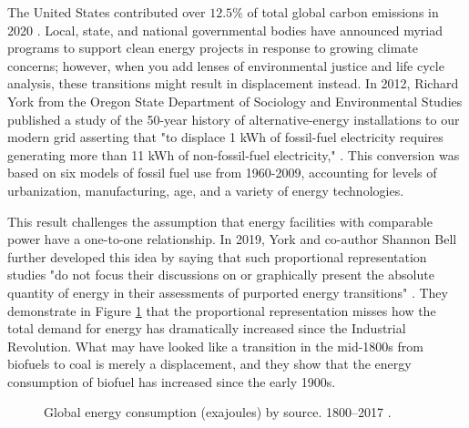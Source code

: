 The United States contributed over $12.5\%$ of total global carbon emissions
in 2020 \cite{european_commission_joint_research_centre_ghg_2021}. Local, state, and national governmental bodies have announced myriad programs to support clean energy projects in response to growing climate concerns; however, when you add lenses of environmental justice and life cycle analysis, these transitions might result in displacement instead. In 2012, Richard York from the Oregon State Department of Sociology and Environmental Studies published a study of the 50-year history of alternative-energy installations to our modern grid asserting that "to displace 1 kWh of fossil-fuel electricity requires
generating more than 11 kWh of non-fossil-fuel electricity,"
\cite{york_alternative_2012}. This conversion was based on six models of fossil
fuel use from 1960-2009, accounting for levels of urbanization, manufacturing,
age, and a variety of energy technologies.

This result challenges the assumption that energy facilities with comparable power have a one-to-one relationship. In 2019, York and co-author
Shannon Bell further developed this idea by saying that such proportional
representation studies "do not focus their discussions on or graphically
present the absolute quantity of energy in their assessments of purported
energy transitions" \cite{york_energy_2019}. They demonstrate in Figure
\ref{fig:percent_total_energy} that the proportional representation misses how
the total demand for energy has dramatically increased since the Industrial
Revolution. What may have looked like a transition in the mid-1800s from
biofuels to coal is merely a displacement, and they show that the energy
consumption of biofuel has increased since the early 1900s.

\begin{figure}[H]
  \hfill
  \caption{
    Global energy consumption (exajoules) by source. 1800--2017
    \cite{york_energy_2019}.}
  \label{fig:percent_total_energy}
\end{figure}

